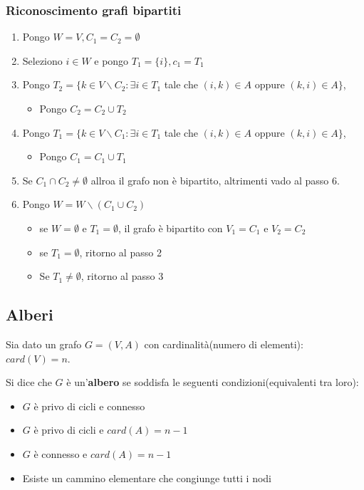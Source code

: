 \subsubsection{Riconoscimento grafi bipartiti}
\begin{enumerate}
    \item Pongo $W = V, C_1 = C_2 = \emptyset$
    \item Seleziono $i \in W$ e pongo $T_1 = \{i\}, c_1 = T_1$
    \item Pongo $T_2 = \{k \in V\backslash C_2 : \exists i \in T_1$ tale che $(i, k) \in A$ oppure $(k, i) \in A\}$, 
           \begin{itemize}
               \item  Pongo $C_2 = C_2 \cup T_2$
           \end{itemize}
    \item Pongo $T_1 = \{k \in V\backslash C_1 : \exists i \in T_1$ tale che $(i, k) \in A$ oppure $(k, i) \in A\}$, 
           \begin{itemize}
               \item Pongo $C_1 = C_1 \cup T_1$
           \end{itemize}
    \item Se $C_1 \cap C_2 \neq \emptyset$ allroa il grafo non è bipartito, altrimenti vado al passo 6.
    \item Pongo $W = W \backslash (C_1 \cup C_2)$
        \begin{itemize}
            \item se $W = \emptyset$ e $T_1 = \emptyset$, il grafo è bipartito con $V_1 = C_1$ e $V_2 = C_2$
            \item se $T_1 = \emptyset$, ritorno al passo 2
            \item Se $T_1 \neq \emptyset$, ritorno al passo 3
        \end{itemize}
\end{enumerate}

\subsection{Alberi}

Sia dato un grafo $G = (V, A)$ con cardinalità(numero di elementi): $card(V) = n$.

Si dice che $G$ è un'\textbf{albero} se soddisfa le seguenti condizioni(equivalenti tra loro):
\begin{itemize}
    \item $G$ è privo di cicli e connesso
    \item $G$ è privo di cicli e $card(A) = n - 1$
    \item $G$ è connesso e $card(A) = n - 1$
    \item Esiste un cammino elementare che congiunge tutti i nodi
\end{itemize}

